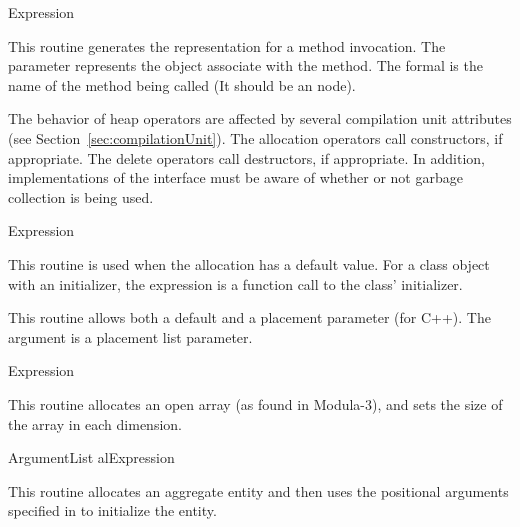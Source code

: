 	{Expression}
\begin{functionality}
This routine generates the representation for a method invocation.
The  parameter represents the object associate with
the method.  The  formal is the name of the method
being called (It should be an  node).

\end{functionality}

The behavior of heap operators are affected by several compilation
unit attributes (see Section~\ref{sec:compilationUnit}).  The
allocation operators call constructors, if appropriate.  The
delete operators call destructors, if appropriate.  In addition,
implementations of the interface must be aware of whether or not
garbage collection is being used.

	{Expression}
\begin{functionality}
This routine is used when the allocation has a default value.
For a class object with an initializer, the expression  is a
function call to the class' initializer.
\end{functionality}
\begin{functionality}
This routine allows both a default and a placement parameter (for C++).
The argument  is a placement list parameter.
\end{functionality}
	{Expression}
\begin{functionality}
This routine allocates an open array (as found in Modula-3), and sets
the size of the array in each dimension.
\end{functionality}
	{ArgumentList al}{Expression}
\begin{functionality}
This routine allocates an aggregate entity and then uses the
positional arguments specified in  to initialize the entity.
\end{functionality}

